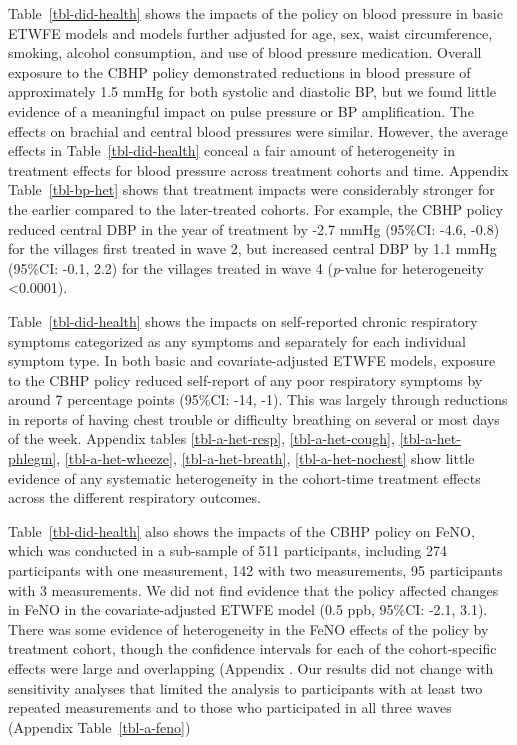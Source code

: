 \documentclass[
  letterpaper,
  DIV=11,
  numbers=noendperiod]{scrartcl}
\begin{document}
Table~\ref{tbl-did-health} shows the impacts of the policy on blood
pressure in basic ETWFE models and models further adjusted for age, sex,
waist circumference, smoking, alcohol consumption, and use of blood
pressure medication. Overall exposure to the CBHP policy demonstrated
reductions in blood pressure of approximately 1.5 mmHg for both systolic
and diastolic BP, but we found little evidence of a meaningful impact on
pulse pressure or BP amplification. The effects on brachial and central
blood pressures were similar. However, the average effects in
Table~\ref{tbl-did-health} conceal a fair amount of heterogeneity in
treatment effects for blood pressure across treatment cohorts and time.
Appendix Table~\ref{tbl-bp-het} shows that treatment impacts were
considerably stronger for the earlier compared to the later-treated
cohorts. For example, the CBHP policy reduced central DBP in the year of
treatment by -2.7 mmHg (95\%CI: -4.6, -0.8) for the villages first
treated in wave 2, but increased central DBP by 1.1 mmHg (95\%CI: -0.1,
2.2) for the villages treated in wave 4 (\emph{p}-value for
heterogeneity \textless0.0001).

Table~\ref{tbl-did-health} shows the impacts on self-reported chronic
respiratory symptoms categorized as any symptoms and separately for each
individual symptom type. In both basic and covariate-adjusted ETWFE
models, exposure to the CBHP policy reduced self-report of any poor
respiratory symptoms by around 7 percentage points (95\%CI: -14, -1).
This was largely through reductions in reports of having chest trouble
or difficulty breathing on several or most days of the week. Appendix
tables \ref{tbl-a-het-resp}, \ref{tbl-a-het-cough},
\ref{tbl-a-het-phlegm}, \ref{tbl-a-het-wheeze}, \ref{tbl-a-het-breath},
\ref{tbl-a-het-nochest} show little evidence of any systematic
heterogeneity in the cohort-time treatment effects across the different
respiratory outcomes.

Table~\ref{tbl-did-health} also shows the impacts of the CBHP policy on
FeNO, which was conducted in a sub-sample of 511 participants, including
274 participants with one measurement, 142 with two measurements, 95
participants with 3 measurements. We did not find evidence that the
policy affected changes in FeNO in the covariate-adjusted ETWFE model
(0.5 ppb, 95\%CI: -2.1, 3.1). There was some evidence of heterogeneity
in the FeNO effects of the policy by treatment cohort, though the
confidence intervals for each of the cohort-specific effects were large
and overlapping (Appendix . Our results did not change with sensitivity
analyses that limited the analysis to participants with at least two
repeated measurements and to those who participated in all three waves
(Appendix Table~\ref{tbl-a-feno})
\end{document}
